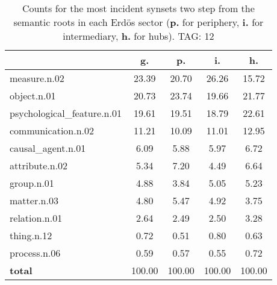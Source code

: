 \begin{table}[h!]
\begin{center}
\begin{tabular}{| l || c | c | c | c |}\hline
 & {\bf g.} & {\bf p.} & {\bf i.} & {\bf h.} \\\hline\hline
measure.n.02 & 23.39  & 20.70  & 26.26  & 15.72 \\\hline
object.n.01 & 20.73  & 23.74  & 19.66  & 21.77 \\\hline
psychological\_feature.n.01 & 19.61  & 19.51  & 18.79  & 22.61 \\\hline
communication.n.02 & 11.21  & 10.09  & 11.01  & 12.95 \\\hline
causal\_agent.n.01 & 6.09  & 5.88  & 5.97  & 6.72 \\\hline
attribute.n.02 & 5.34  & 7.20  & 4.49  & 6.64 \\\hline
group.n.01 & 4.88  & 3.84  & 5.05  & 5.23 \\\hline
matter.n.03 & 4.80  & 5.47  & 4.92  & 3.75 \\\hline
relation.n.01 & 2.64  & 2.49  & 2.50  & 3.28 \\\hline
thing.n.12 & 0.72  & 0.51  & 0.80  & 0.63 \\\hline
process.n.06 & 0.59  & 0.57  & 0.55  & 0.72 \\\hline\hline
{{\bf total}} & 100.00  & 100.00  & 100.00  & 100.00 \\\hline
\end{tabular}
\caption{Counts for the most incident synsets two step from the semantic roots in each Erd\"os sector ({\bf p.} for periphery, {\bf i.} for intermediary, {\bf h.} for hubs). TAG: 12}
\end{center}
\end{table}